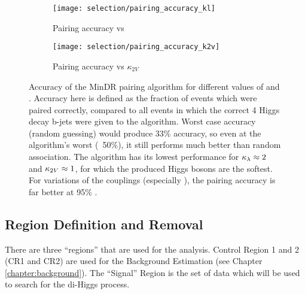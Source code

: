         \begin{figure}[hbt]
            \centering
            \begin{subfigure}{0.48\textwidth}
                \texttt{[image: selection/pairing\_accuracy\_kl]}
                \captionsetup{justification=centering} \caption{Pairing accuracy vs \kl}
                \label{fig:acc_kl_exists}
            \end{subfigure}
            \begin{subfigure}{0.48\textwidth}
                \texttt{[image: selection/pairing\_accuracy\_k2v]}
                \captionsetup{justification=centering} \caption{Pairing accuracy vs $\kappa_{2V}$}
                \label{fig:acc_k2v_exists}
            \end{subfigure}
            \caption{Accuracy of the MinDR pairing algorithm for different values of \kv and \kvv.
                Accuracy here is defined as the fraction of events which were paired correctly,
                compared to all events in which the correct 4 Higgs decay b-jets were given to the algorithm.
                Worst case accuracy (random guessing) would produce 33\% accuracy,
                    so even at the algorithm's worst (~50\%),
                    it still performs much better than random association.
                The algorithm has its lowest performance for $\kappa_{\lambda} \approx 2$ and $\kappa_{2V} \approx 1$,
                    for which the produced Higgs bosons are the softest.
                For variations of the couplings (especially \kvv),
                    the pairing accuracy is far better at 95\% \cite{hh4b_2021_int_note}.
                }
            \label{fig:HHpairing}
        \end{figure}
                                                                                                         


    \subsection{ Region Definition and \ttbar Removal}
        
        There are three ``regions'' that are used for the analysis.
        Control Region 1 and 2 (CR1 and CR2) are used for the Background Estimation (see Chapter \ref{chapter:background}).
        The ``Signal'' Region is the set of data which will be used to search for the di-Higgs process.

